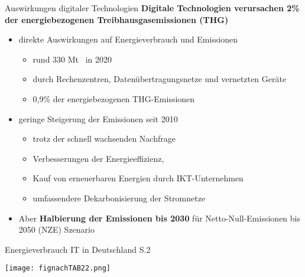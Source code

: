 \begin{frame}{Auswirkungen digitaler Technologien}
%
\textbf{Digitale Technologien verursachen 2\% \\\hspace*{\fill}
                      der energiebezogenen Treibhausgasemissionen (THG)}
		\begin{itemize}
				\item direkte Auswirkungen auf Energieverbrauch und Emissionen
					\begin{itemize}
						\item rund 330 Mt \COze \ in 2020 
						\item durch Rechenzentren, Datenübertragungsnetze und vernetzten Geräte 
						\item 0,9\% der energiebezogenen THG-Emissionen  
				 \end{itemize}
			\pause
			\item geringe Steigerung der Emissionen seit 2010
				\begin{itemize}
					\item trotz der schnell wachsenden Nachfrage   
					\item Verbesserungen der Energieeffizienz, 
					\item Kauf von erneuerbaren Energien durch IKT-Unternehmen 
					\item umfassendere Dekarbonisierung der Stromnetze 
				\end{itemize}
				\pause 
			\item Aber \textbf<4->{Halbierung der Emissionen bis 2030}  für  Netto-Null-Emissionen bis 2050 (NZE) Szenario 
		\end{itemize}
		

\end{frame}

\begin{frame}{Energieverbrauch IT in Deutschland  \cite{grunwald_energy_2022} S.2}
	\begin{center}
	     \texttt{[image: fignachTAB22.png]}\label{fig.fignachTAB22}\infoAbb
	\end{center}

\end{frame}

